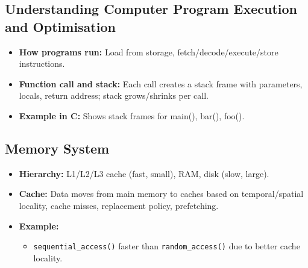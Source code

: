 \documentclass[11pt,a4paper]{article}
\begin{document}
\subsection*{Understanding Computer Program Execution and Optimisation}
\begin{itemize}
    \item \textbf{How programs run:} Load from storage, fetch/decode/execute/store instructions.
    \item \textbf{Function call and stack:} Each call creates a stack frame with parameters, locals, return address; stack grows/shrinks per call.
    \item \textbf{Example in C:} Shows stack frames for main(), bar(), foo().
\end{itemize}

\subsection*{Memory System}
\begin{itemize}
    \item \textbf{Hierarchy:} L1/L2/L3 cache (fast, small), RAM, disk (slow, large).
    \item \textbf{Cache:} Data moves from main memory to caches based on temporal/spatial locality, cache misses, replacement policy, prefetching.
    \item \textbf{Example:}
        \begin{itemize}
            \item \texttt{sequential\_access()} faster than \texttt{random\_access()} due to better cache locality.
        \end{itemize}
\end{itemize}
\end{document}
